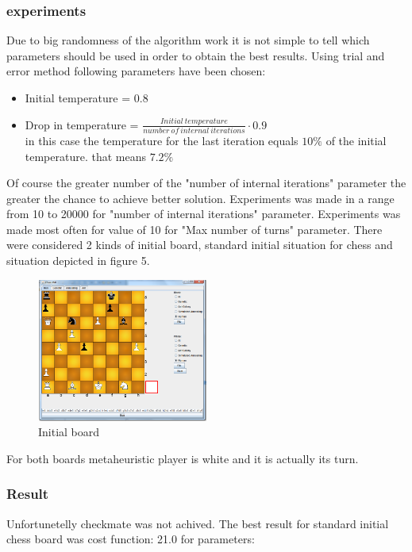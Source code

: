 \documentclass[pdftex]{article}
\begin{document}
\subsubsection{experiments}
Due to big randomness of the algorithm work it is not simple to tell which parameters should be used in order to obtain the best results. Using trial and error method following parameters have been chosen:
\begin{itemize}
	\item Initial temperature = 0.8 \hfill \\

 	\item Drop in temperature = $\frac{Initial \: temperature}{number \: of \: internal \: iterations} \cdot 0.9$ \hfill \\
 	
in this case the temperature for the last iteration equals $10\%$ of the initial temperature. that means $7.2\%$
\end{itemize}
Of course the greater number of the "number of internal iterations" parameter the greater the chance to achieve better solution. Experiments was made in a range from 10 to 20000 for "number of internal iterations" parameter.
Experiments was made most often for value of 10 for "Max number of turns" parameter. There were considered 2 kinds of initial board, standard initial situation for chess and situation depicted in figure 5.

\begin{figure}[!htb]
	\centering
	\includegraphics[width=0.5\textwidth]{annealing/board.png} 
	\caption{Initial board}
	\label{fig:initialBoard}
\end{figure}

For both boards metaheuristic player is white and it is actually its turn.
 
\subsubsection{Result}
Unfortunetelly checkmate was not achived. The best result for standard initial chess board was cost function: 21.0 for parameters:
\end{document}
